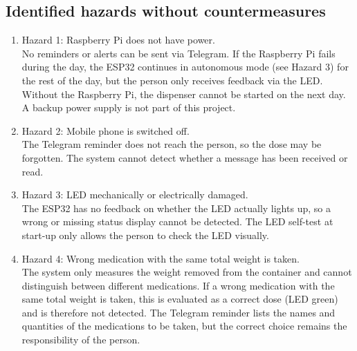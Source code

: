\subsection{Identified hazards without countermeasures}
\label{sec:hazards-without}

	\begin{enumerate}
		\item Hazard 1: Raspberry Pi does not have power. \\
		No reminders or alerts can be sent via Telegram. If the Raspberry Pi fails during the day, the ESP32 continues in
		autonomous mode (see Hazard 3) for the rest of the day, but the person only receives feedback via the LED. Without
		the Raspberry Pi, the dispenser cannot be started on the next day. A backup power supply is not part of this project.
		\item Hazard 2: Mobile phone is switched off. \\
		The Telegram reminder does not reach the person, so the dose may be forgotten. The system cannot detect whether 
		a message has been received or read.
		\item Hazard 3: LED mechanically or electrically damaged. \\
		The ESP32 has no feedback on whether the LED actually lights up, so a wrong or missing status display cannot be 
		detected. The LED self-test at start-up only allows the person to check the LED visually.
		\item Hazard 4: Wrong medication with the same total weight is taken. \\
		The system only measures the weight removed from the container and cannot 
		distinguish between different medications. If a wrong medication with the same total weight is taken, 
		this is evaluated as a correct dose (LED green) and is therefore not detected. The Telegram reminder lists the names 
		and quantities of the medications to be taken, but the correct choice remains the responsibility of the person.
	\end{enumerate}